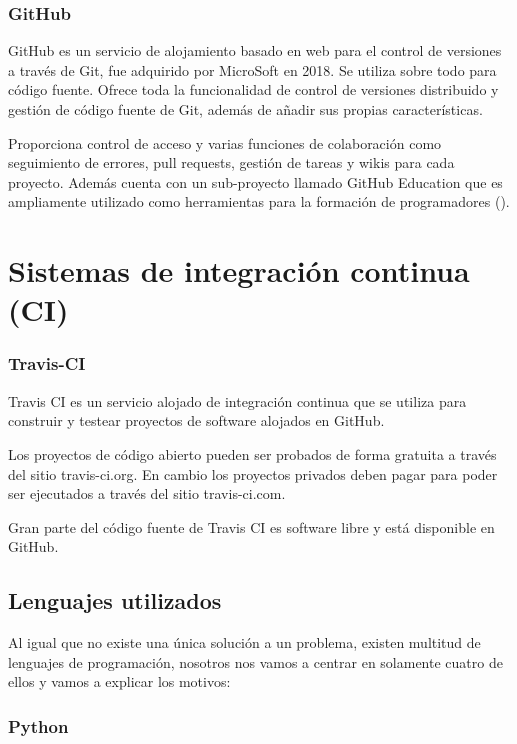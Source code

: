 \subsubsection {GitHub}

GitHub es un servicio de alojamiento basado en web para el control de versiones a través de Git, fue adquirido por MicroSoft en 2018. Se utiliza sobre todo para código fuente. Ofrece toda la funcionalidad de control de versiones distribuido y gestión de código fuente de Git, además de añadir sus propias características.

Proporciona control de acceso y varias funciones de colaboración como seguimiento de errores, pull requests, gestión de tareas y wikis para cada proyecto. Además cuenta con un sub-proyecto llamado GitHub Education que es ampliamente utilizado como herramientas para la formación de programadores (\cite{hernandez_integracion_2018}).


\section {Sistemas de integración continua (CI)}

\subsubsection {Travis-CI}

Travis CI es un servicio alojado de integración continua que se utiliza para construir y testear proyectos de software alojados en GitHub.

Los proyectos de código abierto pueden ser probados de forma gratuita a través del sitio travis-ci.org. En cambio los proyectos privados deben pagar para poder ser ejecutados a través del sitio travis-ci.com.

Gran parte del código fuente de Travis CI es software libre y está disponible en GitHub.

\subsection{Lenguajes utilizados}

Al igual que no existe una única solución a un problema, existen multitud de lenguajes de programación, nosotros nos vamos a centrar en solamente cuatro de ellos y vamos a explicar los motivos:

\subsubsection{Python}


